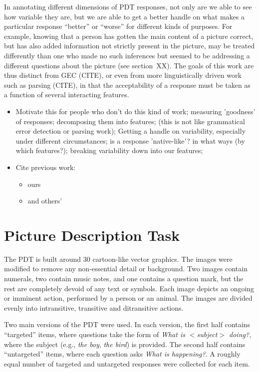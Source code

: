 \documentclass[11pt,a4paper]{article}
\begin{document}
In annotating different dimensions of PDT responses, not only are we
able to see how variable they are, but we are able to get a better
handle on what makes a particular response ``better'' or ``worse'' for
different kinds of purposes.  For example, knowing that a person has
gotten the main content of a picture correct, but has also added
information not strictly present in the picture, may be treated
differently than one who made no such inferences but seemed to be
addressing a different questions about the picture (see section~XX).
The goals of this work are thus distinct from GEC (CITE), or even from
more linguistically driven work such as parsing (CITE), in that the
acceptability of a response must be taken as a function of several
interacting features.

\begin{itemize}
\item Motivate this for people who don't do this kind of work; measuring 'goodness' of responses; decomposing them into features; (this is not like grammatical error detection or parsing work); Getting a handle on variability, especially under different circumstances; is a response 'native-like'? in what ways (by which features?); breaking variability down into our features;
\item Cite previous work:
  \begin{itemize}
  \item ours \citep{king:dickinson:13} 
  \item and others' \citep{somasundaran:ea:15}
  \end{itemize}
\end{itemize}

\section{Picture Description Task}

The PDT is built around 30 cartoon-like vector graphics. The images were modified to remove any non-essential detail or background. Two images contain numerals, two contain music notes, and one contains a question mark, but the rest are completely devoid of any text or symbols. Each image depicts an ongoing or imminent action, performed by a person or an animal. The images are divided evenly into intransitive, transitive and ditransitive actions. 

Two main versions of the PDT were used. In each version, the first half contains ``targeted'' items, where questions take the form of \textit{What is $<$subject$>$ doing?}, where the subject (e.g., \textit{the boy}, \textit{the bird}) is provided. The second half contains ``untargeted'' items, where each question asks \textit{What is happening?}. A roughly equal number of targeted and untargeted responses were collected for each item.
\end{document}
